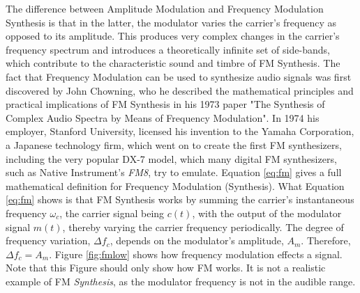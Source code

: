 The difference between Amplitude Modulation and Frequency Modulation Synthesis is that in the latter, the modulator varies the carrier's frequency as opposed to its amplitude. This produces very complex changes in the carrier's frequency spectrum and introduces a theoretically infinite set of side-bands, which contribute to the characteristic sound and timbre of FM Synthesis. The fact that Frequency Modulation can be used to synthesize audio signals was first discovered by John Chowning, who he described the mathematical principles and practical implications of FM Synthesis in his 1973 paper "The Synthesis of Complex Audio Spectra by Means of Frequency Modulation". In 1974 his employer, Stanford University, licensed his invention to the Yamaha Corporation, a Japanese technology firm, which went on to create the first FM synthesizers, including the very popular DX-7 model, which many digital FM synthesizers, such as Native Instrument's \emph{FM8}, try to emulate. Equation \ref{eq:fm} gives a full mathematical definition for Frequency Modulation (Synthesis). What Equation \ref{eq:fm} shows is that FM Synthesis works by summing the carrier's instantaneous frequency $\omega_{c}$, the carrier signal being $c(t)$, with the output of the modulator signal $m(t)$, thereby varying the carrier frequency periodically. The degree of frequency variation, $\Delta f_{c}$, depends on the modulator's amplitude, $A_{m}$. Therefore, $\Delta f_{c} = A_{m}$. Figure \ref{fig:fmlow} shows how frequency modulation effects a signal. Note that this Figure should only show how FM works. It is not a realistic example of FM \emph{Synthesis}, as the modulator frequency is not in the audible range.

\pagebreak

